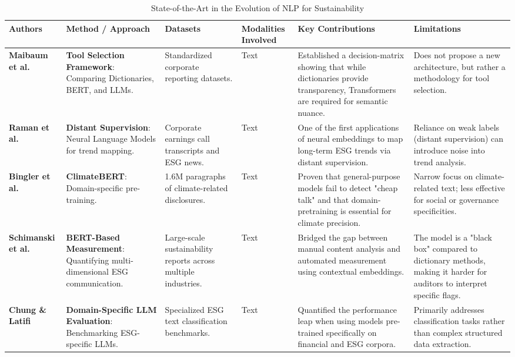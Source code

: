 \begin{landscape}
\begin{table}[p]
\centering
\caption{State-of-the-Art in the Evolution of NLP for Sustainability}
\label{tab:nlp-evolution-sustainability-2}
\small
\renewcommand{\arraystretch}{1.2}
\begin{tabularx}{\linewidth}{|p{1.8cm}|p{3.5cm}|p{3cm}|p{1.8cm}|X|X|}
\hline
Authors & Method / Approach & Datasets & Modalities Involved & Key Contributions & Limitations \\ \hline
\textbf{Maibaum et al.}  \parencite{frederik_maibaum_b8629037} & \textbf{Tool Selection Framework}: Comparing Dictionaries, BERT, and LLMs. & Standardized corporate reporting datasets. & Text & Established a decision-matrix showing that while dictionaries provide transparency, Transformers are required for semantic nuance. & Does not propose a new architecture, but rather a methodology for tool selection. \\ \hline
\textbf{Raman et al.}  \parencite{natraj_raman_009776f2} & \textbf{Distant Supervision}: Neural Language Models for trend mapping. & Corporate earnings call transcripts and ESG news. & Text & One of the first applications of neural embeddings to map long-term ESG trends via distant supervision. & Reliance on weak labels (distant supervision) can introduce noise into trend analysis. \\ \hline
\textbf{Bingler et al.}  \parencite{julia_bingler_268445e3} & \textbf{ClimateBERT}: Domain-specific pre-training. & 1.6M paragraphs of climate-related disclosures. & Text & Proven that general-purpose models fail to detect "cheap talk" and that domain-pretraining is essential for climate precision. & Narrow focus on climate-related text; less effective for social or governance specificities. \\ \hline
\textbf{Schimanski et al.}  \parencite{tobias_schimanski_4e192ec5} & \textbf{BERT-Based Measurement}: Quantifying multi-dimensional ESG communication. & Large-scale sustainability reports across multiple industries. & Text & Bridged the gap between manual content analysis and automated measurement using contextual embeddings. & The model is a "black box" compared to dictionary methods, making it harder for auditors to interpret specific flags. \\ \hline
\textbf{Chung \& Latifi}  \parencite{tae_sun_chung_e16a4c18} & \textbf{Domain-Specific LLM Evaluation}: Benchmarking ESG-specific LLMs. & Specialized ESG text classification benchmarks. & Text & Quantified the performance leap when using models pre-trained specifically on financial and ESG corpora. & Primarily addresses classification tasks rather than complex structured data extraction. \\ \hline

\end{tabularx}
\end{table}
\end{landscape}

